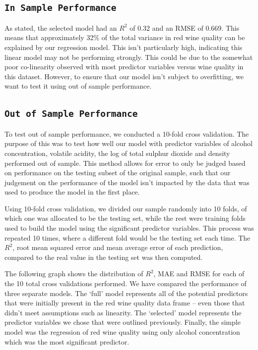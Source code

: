 \documentclass[letterpaper,8pt,twocolumn,twoside,]{pinp}
\begin{document}
\hypertarget{in-sample-performance}{%
\subsection{\texorpdfstring{\texttt{In\ Sample\ Performance}}{In Sample Performance}}\label{in-sample-performance}}

As stated, the selected model had an \(R^2\) of 0.32 and an RMSE of
0.669. This means that approximately 32\% of the total variance in red
wine quality can be explained by our regression model. This isn't
particularly high, indicating this linear model may not be performing
strongly. This could be due to the somewhat poor co-linearity observed
with most predictor variables versus wine quality in this dataset.
However, to ensure that our model isn't subject to overfitting, we want
to test it using out of sample performance.

\hypertarget{out-of-sample-performance}{%
\subsection{\texorpdfstring{\texttt{Out\ of\ Sample\ Performance}}{Out of Sample Performance}}\label{out-of-sample-performance}}

To test out of sample performance, we conducted a 10-fold cross
validation. The purpose of this was to test how well our model with
predictor variables of alcohol concentration, volatile acidity, the log
of total sulphur dioxide and density performed out of sample. This
method allows for error to only be judged based on performance on the
testing subset of the original sample, such that our judgement on the
performance of the model isn't impacted by the data that was used to
produce the model in the first place.

Using 10-fold cross validation, we divided our sample randomly into 10
folds, of which one was allocated to be the testing set, while the rest
were training folds used to build the model using the significant
predictor variables. This process was repeated 10 times, where a
different fold would be the testing set each time. The \(R^2\), root
mean squared error and mean average error of each prediction, compared
to the real value in the testing set was then computed.

The following graph shows the distribution of \(R^2\), MAE and RMSE for
each of the 10 total cross validations performed. We have compared the
performance of three separate models. The `full' model represents all of
the potential predictors that were initially present in the red wine
quality data frame -- even those that didn't meet assumptions such as
linearity. The `selected' model represents the predictor variables we
chose that were outlined previously. Finally, the simple model was the
regression of red wine quality using only alcohol concentration which
was the most significant predictor.
\end{document}

